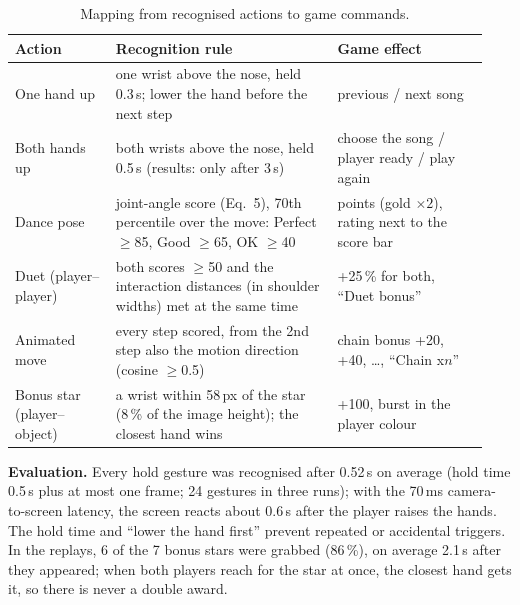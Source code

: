 \begin{table}[h]
  \centering\footnotesize
  \begin{tabular}{@{}p{0.2\linewidth}p{0.44\linewidth}p{0.3\linewidth}@{}}
    \toprule
    Action & Recognition rule & Game effect \\
    \midrule
    One hand up & one wrist above the nose, held 0.3\,s; lower the hand before the next step & previous / next song \\
    Both hands up & both wrists above the nose, held 0.5\,s (results: only after 3\,s) & choose the song / player ready / play again \\
    Dance pose & joint-angle score (Eq.~5), 70th percentile over the move: Perfect $\geq$85, Good $\geq$65, OK $\geq$40 & points (gold $\times 2$), rating next to the score bar \\
    Duet (player--player) & both scores $\geq$50 and the interaction distances (in shoulder widths) met at the same time & +25\,\% for both, ``Duet bonus'' \\
    Animated move & every step scored, from the 2nd step also the motion direction (cosine $\geq$0.5) & chain bonus +20, +40, \ldots, ``Chain x$n$'' \\
    Bonus star (player--object) & a wrist within 58\,px of the star (8\,\% of the image height); the closest hand wins & +100, burst in the player colour \\
    \bottomrule
  \end{tabular}
  \caption{Mapping from recognised actions to game commands.}
  \label{tab:actions}
\end{table}

\textbf{Evaluation.} Every hold gesture was recognised after 0.52\,s on average (hold time 0.5\,s plus at most
one frame; 24 gestures in three runs); with the 70\,ms camera-to-screen latency, the screen reacts about
0.6\,s after the player raises the hands. The hold time and ``lower the hand first'' prevent repeated or
accidental triggers. In the replays, 6 of the 7 bonus stars were grabbed (86\,\%), on average 2.1\,s after they appeared; when both
players reach for the star at once, the closest hand gets it, so there is never a double award.
